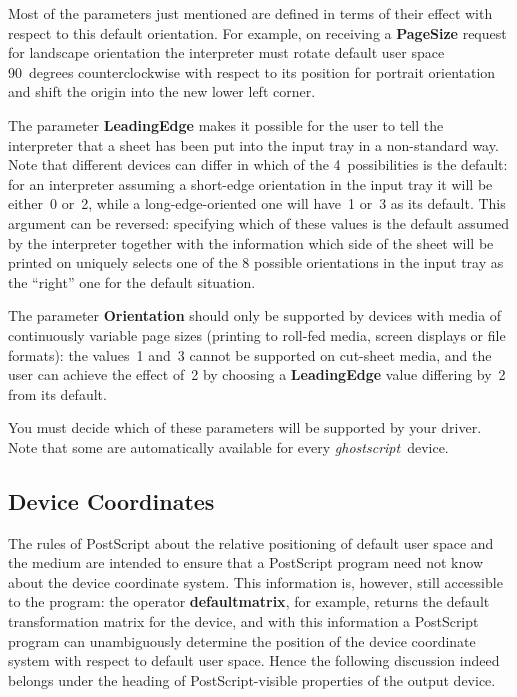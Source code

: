 \documentclass[twoside,a4paper]{article}
\newcommand{\gs}{\textit{ghostscript\/}}
\newcommand{\ps}[1]{{\sffamily\bfseries #1}}	%
\begin{document}
Most of the parameters just mentioned are defined in terms of their effect
with respect to this default orientation.
For example,
on receiving a \ps{PageSize} request for landscape orientation the interpreter
must rotate default user space 90~degrees counterclockwise with respect to
its position for portrait orientation and shift the origin into the
new lower left corner.

The parameter \ps{LeadingEdge} makes it possible for the user to tell the
interpreter that a sheet has been put into the input tray in a non-standard
way.
Note that different devices can differ in which of the 4~possibilities is the
default:
for an interpreter assuming a short-edge orientation in the input tray it will
be either~0 or~2,
while a long-edge-oriented one will have~1 or~3 as its default.
This argument can be reversed:
specifying which of these values is the default assumed by the interpreter
together with the information which side of the sheet will be printed on
uniquely selects one of the 8 possible orientations in the input tray as the
``right'' one for the default situation.

The parameter \ps{Orientation} should only be supported by devices
with media of continuously variable page sizes (printing to roll-fed media,
screen displays or file formats):
the values~1 and~3 cannot be supported on cut-sheet media,
and the user can achieve the effect of~2 by choosing a \ps{LeadingEdge} value
differing by~2 from its default.

You must decide which of these parameters will be supported by your driver.
Note that some are automatically available for every \gs\ device.


\subsection{Device Coordinates}

The rules of PostScript about the relative positioning of default user space
and the medium are intended to ensure that a PostScript program need not know
about the device coordinate system.
This information is, however, still accessible to the program:
the operator \ps{defaultmatrix}, for example,
returns the default transformation matrix for the device,
and with this information a PostScript program can unambiguously determine the
position of the device coordinate system with respect to default user space.
Hence the following discussion indeed belongs under the heading of
PostScript-visible properties of the output device.
\end{document}
